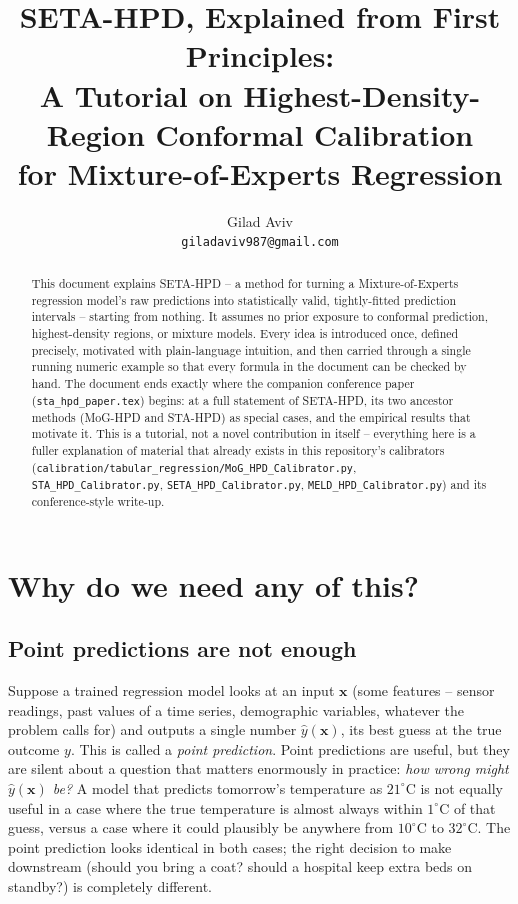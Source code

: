 \documentclass[11pt]{article}
\title{\Large SETA-HPD, Explained from First Principles:\\
A Tutorial on Highest-Density-Region Conformal Calibration\\
for Mixture-of-Experts Regression}
\author{Gilad Aviv\\ \texttt{giladaviv987@gmail.com}}
\date{}
\begin{document}
\maketitle

\begin{abstract}
This document explains SETA-HPD -- a method for turning a Mixture-of-Experts regression model's
raw predictions into statistically valid, tightly-fitted prediction intervals -- starting from
nothing. It assumes no prior exposure to conformal prediction, highest-density regions, or
mixture models. Every idea is introduced once, defined precisely, motivated with plain-language
intuition, and then carried through a single running numeric example so that every formula in
the document can be checked by hand. The document ends exactly where the companion conference
paper (\texttt{sta\_hpd\_paper.tex}) begins: at a full statement of SETA-HPD, its two ancestor
methods (MoG-HPD and STA-HPD) as special cases, and the empirical results that motivate it. This
is a tutorial, not a novel contribution in itself -- everything here is a fuller explanation of
material that already exists in this repository's calibrators
(\texttt{calibration/tabular\_regression/MoG\_HPD\_Calibrator.py},
\texttt{STA\_HPD\_Calibrator.py}, \texttt{SETA\_HPD\_Calibrator.py},
\texttt{MELD\_HPD\_Calibrator.py}) and its conference-style write-up.
\end{abstract}

\tableofcontents

\section{Why do we need any of this?}
\label{sec:why}

\subsection{Point predictions are not enough}

Suppose a trained regression model looks at an input $\bm x$ (some features -- sensor readings,
past values of a time series, demographic variables, whatever the problem calls for) and
outputs a single number $\hat y(\bm x)$, its best guess at the true outcome $y$. This is called a
\emph{point prediction}. Point predictions are useful, but they are silent about a question that
matters enormously in practice: \emph{how wrong might $\hat y(\bm x)$ be?} A model that predicts
tomorrow's temperature as $21^\circ$C is not equally useful in a case where the true temperature
is almost always within $1^\circ$C of that guess, versus a case where it could plausibly be
anywhere from $10^\circ$C to $32^\circ$C. The point prediction looks identical in both cases; the
right decision to make downstream (should you bring a coat? should a hospital keep extra beds on
standby?) is completely different.
\end{document}

